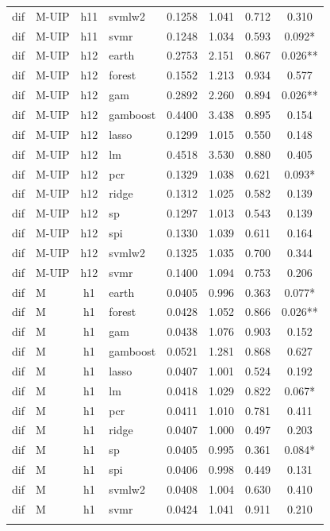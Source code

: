 \begin{ThreePartTable}
\begin{longtable}[t]{llclcccc}
dif & M-UIP & h11 & svmlw2 & 0.1258 & 1.041 & 0.712 & 0.310\\
dif & M-UIP & h11 & svmr & 0.1248 & 1.034 & 0.593 & 0.092*\\
\addlinespace
dif & M-UIP & h12 & earth & 0.2753 & 2.151 & 0.867 & 0.026**\\
dif & M-UIP & h12 & forest & 0.1552 & 1.213 & 0.934 & 0.577\\
dif & M-UIP & h12 & gam & 0.2892 & 2.260 & 0.894 & 0.026**\\
dif & M-UIP & h12 & gamboost & 0.4400 & 3.438 & 0.895 & 0.154\\
dif & M-UIP & h12 & lasso & 0.1299 & 1.015 & 0.550 & 0.148\\
dif & M-UIP & h12 & lm & 0.4518 & 3.530 & 0.880 & 0.405\\
dif & M-UIP & h12 & pcr & 0.1329 & 1.038 & 0.621 & 0.093*\\
dif & M-UIP & h12 & ridge & 0.1312 & 1.025 & 0.582 & 0.139\\
dif & M-UIP & h12 & sp & 0.1297 & 1.013 & 0.543 & 0.139\\
dif & M-UIP & h12 & spi & 0.1330 & 1.039 & 0.611 & 0.164\\
dif & M-UIP & h12 & svmlw2 & 0.1325 & 1.035 & 0.700 & 0.344\\
dif & M-UIP & h12 & svmr & 0.1400 & 1.094 & 0.753 & 0.206\\
\addlinespace
dif & M & h1 & earth & 0.0405 & 0.996 & 0.363 & 0.077*\\
dif & M & h1 & forest & 0.0428 & 1.052 & 0.866 & 0.026**\\
dif & M & h1 & gam & 0.0438 & 1.076 & 0.903 & 0.152\\
dif & M & h1 & gamboost & 0.0521 & 1.281 & 0.868 & 0.627\\
dif & M & h1 & lasso & 0.0407 & 1.001 & 0.524 & 0.192\\
dif & M & h1 & lm & 0.0418 & 1.029 & 0.822 & 0.067*\\
dif & M & h1 & pcr & 0.0411 & 1.010 & 0.781 & 0.411\\
dif & M & h1 & ridge & 0.0407 & 1.000 & 0.497 & 0.203\\
dif & M & h1 & sp & 0.0405 & 0.995 & 0.361 & 0.084*\\
dif & M & h1 & spi & 0.0406 & 0.998 & 0.449 & 0.131\\
dif & M & h1 & svmlw2 & 0.0408 & 1.004 & 0.630 & 0.410\\
dif & M & h1 & svmr & 0.0424 & 1.041 & 0.911 & 0.210\\
\addlinespace

\end{longtable}
\end{ThreePartTable}
